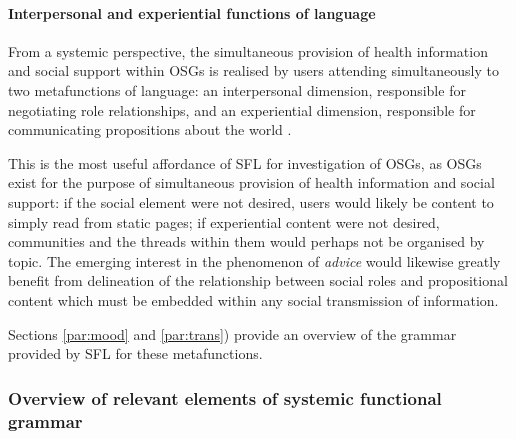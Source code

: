 		 \paragraph{Interpersonal and experiential functions of language}

			From a systemic perspective, the simultaneous provision of health information and social support within OSGs is realised by users attending simultaneously to two metafunctions of language: an interpersonal dimension, responsible for negotiating role relationships, and an experiential dimension, responsible for communicating propositions about the world \cite{butt_using_2009}.

			This is the most useful affordance of SFL for investigation of OSGs, as OSGs exist for the purpose of simultaneous provision of health information and social support: if the social element were not desired, users would likely be content to simply read from static pages; if experiential content were not desired, communities and the threads within them would perhaps not be organised by topic. The emerging interest in the phenomenon of \emph{advice} would likewise greatly benefit from delineation of the relationship between social roles and propositional content which must be embedded within any social transmission of information.

			Sections \ref{par:mood} and \ref{par:trans}) provide an overview of the grammar provided by SFL for these metafunctions.

	  \subsubsection{Overview of relevant elements of systemic functional grammar}




